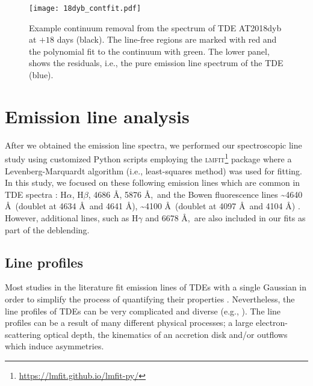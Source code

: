 \documentclass[structabstract]{aa}
\begin{document}
\begin{figure}
\centering
\texttt{[image: 18dyb\_contfit.pdf]}
\caption{Example continuum removal from the spectrum of TDE AT2018dyb at $+18$ days (black). The line-free regions are marked with red and the polynomial fit to the continuum with green. The lower panel, shows the residuals, i.e., the pure emission line spectrum of the TDE (blue).
}\label{fig:contsub}
\end{figure}

\section{Emission line analysis} \label{sec:els}

After we obtained the emission line spectra, we performed our spectroscopic line study using customized Python scripts employing the \textsc{lmfit}\footnote{\url{https://lmfit.github.io/lmfit-py/}} package \citep{Newville2016} where a Levenberg-Marquardt algorithm (i.e., least-squares method) was used for fitting. In this study, we focused on these following emission lines which are common in TDE spectra \citep[e.g.,][]{Arcavi2014,Leloudas2019,vanvelzen2021}: H$\alpha$, H$\beta$,  4686 \AA,  5876 \AA,\, and the Bowen fluorescence lines  \textasciitilde4640 \AA\, (doublet at 4634 \AA\, and 4641 \AA),  \textasciitilde4100 \AA\, (doublet at 4097 \AA\, and 4104 \AA) \citep{Osterbrock1974}. However, additional lines, such as H$\gamma$ and  6678 \AA,\, are also included in our fits as part of the deblending.

\subsection{Line profiles}
\label{subsub:lp}
Most studies in the literature fit emission lines of TDEs with a single Gaussian in order to simplify the process of quantifying their properties \citep[e.g][]{Arcavi2014,Blagorodnova2017,Hung2017}. Nevertheless, the line profiles of TDEs can be very complicated and diverse (e.g., \citealt{Holoien2018,Short2020a,Nicholl2020}). The line profiles can be a result of many different physical processes; a large electron-scattering
optical depth, the kinematics of an accretion disk %
and/or outflows which induce asymmetries.
\end{document}
